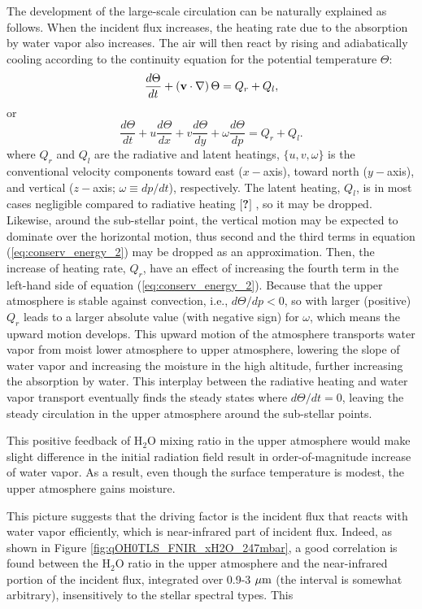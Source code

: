 \documentclass[11pt,numberedappendix,twocolappendix,]{emulateapj}
\def\water{H$_2$O }
\def\memo#1{\color{red}$[${\bf #1}$]$ \color{black}}
\begin{document}
The development of the large-scale circulation can be naturally explained as follows. 
When the incident flux increases, the heating rate due to the absorption by water vapor also increases. 
The air will then react by rising and adiabatically cooling according to the continuity equation for the potential temperature $\Theta $:
\begin{equation}
\frac{d\Theta }{dt} + ( {\bf v} \cdot \nabla ) \, \Theta = Q_r + Q_l, \label{eq:conserv_energy}
\end{equation}
or
\begin{equation}
\frac{d\Theta }{dt} + u \frac{d\Theta }{dx} + v \frac{d\Theta }{dy} + \omega \frac{d\Theta }{dp} = Q_r + Q_l. \label{eq:conserv_energy_2}
\end{equation}
where $Q_r$ and $Q_l$ are the radiative and latent heatings, $\{ u, v, \omega \}$ is the conventional velocity components toward east ($x-$axis), toward north ($y-$axis), and vertical ($z-$axis; $\omega \equiv  dp/dt$), respectively. 
The latent heating, $Q_l$, is in most cases negligible compared to radiative heating \memo{?}, so it may be dropped. 
Likewise, around the sub-stellar point, the vertical motion may be expected to dominate over the horizontal motion, thus second and the third terms in equation (\ref{eq:conserv_energy_2}) may be dropped as an approximation. 
Then, the increase of heating rate, $Q_r$, have an effect of increasing the fourth term in the left-hand side of equation (\ref{eq:conserv_energy_2}). 
Because that the upper atmosphere is stable against convection, i.e., $d \Theta / d p < 0 $, so with larger (positive) $Q_r$ leads to a larger absolute value (with negative sign) for $\omega $, which means the upward motion develops. 
This upward motion of the atmosphere transports water vapor from moist lower atmosphere to upper atmosphere, lowering the slope of water vapor and increasing the moisture in the high altitude, further increasing the absorption by water. 
This interplay between the radiative heating and water vapor transport eventually finds the steady states where $d\Theta/dt = 0$, leaving the steady circulation in the upper atmosphere around the sub-stellar points. 

This positive feedback of \water mixing ratio in the upper atmosphere would make slight difference in the initial radiation field result in order-of-magnitude increase of water vapor. 
As a result, even though the surface temperature is modest, the upper atmosphere gains moisture.  

This picture suggests that the driving factor is the incident flux that reacts with water vapor efficiently, which is near-infrared part of incident flux. 
Indeed, as shown in Figure \ref{fig:qOH0TLS_FNIR_xH2O_247mbar}, a good correlation is found between the \water ratio in the upper atmosphere and the near-infrared portion of the incident flux, integrated over 0.9-3 $\mu {\rm m}$ (the interval is somewhat arbitrary), insensitively to the stellar spectral types. 
This 
\end{document}
